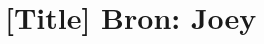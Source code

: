 \documentclass[12pt, a4paper]{article}
\begin{document}
	\begin{minipage}{\textwidth}
		\section{[Title] \hfill\small Bron: Joey}

	\end{minipage} \\ \\
		
\end{document}
